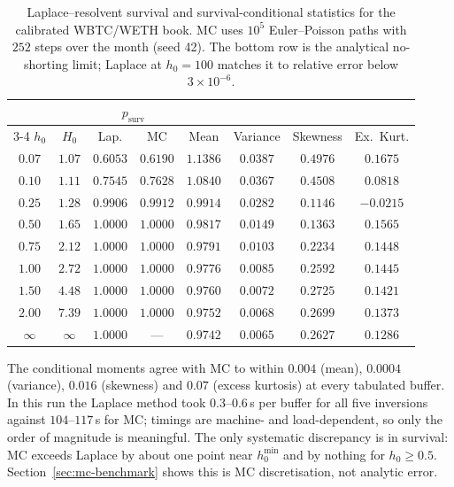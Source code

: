 \documentclass[11pt]{article}
\theoremstyle{plain}
\theoremstyle{definition}
\theoremstyle{remark}
\begin{document}
\begin{table}[ht]
\centering\small
\renewcommand{\arraystretch}{1.15}
\begin{tabular}{cc cc cccc}
\toprule
& & \multicolumn{2}{c}{$p_{\mathrm{surv}}$} & & & & \\
\cmidrule(lr){3-4}
$h_0$ & $H_0$ & Lap. & MC & Mean & Variance & Skewness & Ex.\ Kurt. \\
\midrule
$0.07$ & $1.07$ & $0.6053$ & $0.6190$ & $1.1386$ & $0.0387$ & $0.4976$ & $0.1675$ \\
$0.10$ & $1.11$ & $0.7545$ & $0.7628$ & $1.0840$ & $0.0367$ & $0.4508$ & $0.0818$ \\
$0.25$ & $1.28$ & $0.9906$ & $0.9912$ & $0.9914$ & $0.0282$ & $0.1146$ & $-0.0215$ \\
$0.50$ & $1.65$ & $1.0000$ & $1.0000$ & $0.9817$ & $0.0149$ & $0.1363$ & $0.1565$ \\
$0.75$ & $2.12$ & $1.0000$ & $1.0000$ & $0.9791$ & $0.0103$ & $0.2234$ & $0.1448$ \\
$1.00$ & $2.72$ & $1.0000$ & $1.0000$ & $0.9776$ & $0.0085$ & $0.2592$ & $0.1445$ \\
$1.50$ & $4.48$ & $1.0000$ & $1.0000$ & $0.9760$ & $0.0072$ & $0.2725$ & $0.1421$ \\
$2.00$ & $7.39$ & $1.0000$ & $1.0000$ & $0.9752$ & $0.0068$ & $0.2699$ & $0.1373$ \\
\midrule
$\infty$ & $\infty$ & $1.0000$ & --- & $0.9742$ & $0.0065$ & $0.2627$ & $0.1286$ \\
\bottomrule
\end{tabular}
\caption{Laplace--resolvent survival and survival-conditional statistics for the calibrated
WBTC/WETH book. MC uses $10^5$ Euler--Poisson paths with $252$ steps over the month (seed 42). The
bottom row is the analytical no-shorting limit; Laplace at $h_0=100$ matches it to relative error
below $3\times10^{-6}$.}
\label{tab:results}
\end{table}

The conditional moments agree with MC to within $0.004$ (mean), $0.0004$ (variance), $0.016$
(skewness) and $0.07$ (excess kurtosis) at every tabulated buffer. In this run the Laplace method
took $0.3$--$0.6$\,s per buffer for all five inversions against $104$--$117$\,s for MC; timings are
machine- and load-dependent, so only the order of magnitude is meaningful. The only systematic
discrepancy is in survival: MC exceeds Laplace by about one point near $h_0^{\min}$ and by nothing
for $h_0\ge0.5$. Section~\ref{sec:mc-benchmark} shows this is MC
discretisation, not analytic error.
\end{document}

